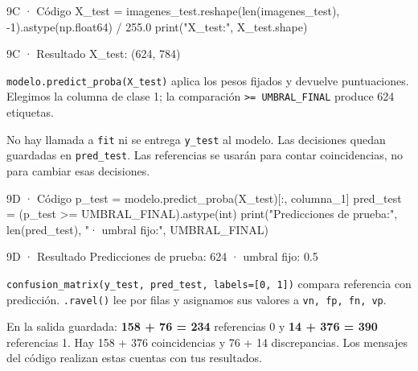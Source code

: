 \begin{Codigo}{9C · Código}
X_test = imagenes_test.reshape(len(imagenes_test), -1).astype(np.float64) / 255.0
print("X_test:", X_test.shape)
\end{Codigo}

\begin{Salida}{9C · Resultado}
X_test: (624, 784)
\end{Salida}

\label{paso-9d}

\texttt{\small modelo.\allowbreak{}predict\_\allowbreak{}proba(\allowbreak{}X\_\allowbreak{}test)\allowbreak{}} aplica los pesos fijados y devuelve puntuaciones. Elegimos la columna de clase 1; la comparación \texttt{\small >=\allowbreak{} UMBRAL\_\allowbreak{}FINAL} produce 624 etiquetas.

No hay llamada a \texttt{\small fit} ni se entrega \texttt{\small y\_\allowbreak{}test} al modelo. Las decisiones quedan guardadas en \texttt{\small pred\_\allowbreak{}test}. Las referencias se usarán para contar coincidencias, no para cambiar esas decisiones.


\begin{Codigo}{9D · Código}
p_test = modelo.predict_proba(X_test)[:, columna_1]
pred_test = (p_test >= UMBRAL_FINAL).astype(int)
print("Predicciones de prueba:", len(pred_test), "· umbral fijo:", UMBRAL_FINAL)
\end{Codigo}

\begin{Salida}{9D · Resultado}
Predicciones de prueba: 624 · umbral fijo: 0.5
\end{Salida}

\label{paso-9e}

\texttt{\small confusion\_\allowbreak{}matrix(\allowbreak{}y\_\allowbreak{}test,\allowbreak{} pred\_\allowbreak{}test,\allowbreak{} labels=\allowbreak{}[\allowbreak{}0,\allowbreak{} 1]\allowbreak{})\allowbreak{}} compara referencia con predicción. \texttt{\small .\allowbreak{}ravel(\allowbreak{})\allowbreak{}} lee por filas y asignamos sus valores a \texttt{\small vn,\allowbreak{} fp,\allowbreak{} fn,\allowbreak{} vp}.

En la salida guardada: \textbf{158 + 76 = 234} referencias 0 y \textbf{14 + 376 = 390} referencias 1. Hay 158 + 376 coincidencias y 76 + 14 discrepancias. Los mensajes del código realizan estas cuentas con tus resultados.


